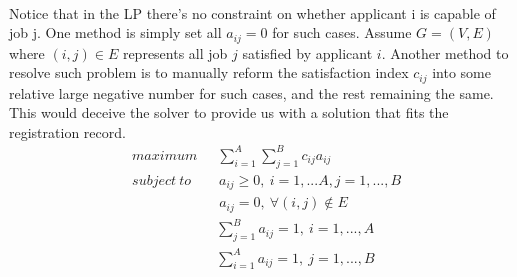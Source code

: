 \paragraph{}
Notice that in the LP there's no constraint on whether applicant i is capable of job j. One method is simply set all $a_{ij} = 0$ for such cases. Assume $G=(V,E)$ where $(i, j)\in E$ represents all job $j$ satisfied by applicant $i$. Another method to resolve such problem is to manually reform the satisfaction index $c_{ij}$ into some relative large negative number for such cases, and the rest remaining the same. This would deceive the solver to provide us with a solution that fits the registration record. 
\begin{align*}
& maximum \quad \ \ \sum_{i=1}^{A}\sum_{j=1}^{B}c_{ij}a_{ij} \\
& subject \ to \qquad a_{ij}\geq 0, \ i=1,...A, j=1,...,B\\
&\qquad \qquad \quad \quad  \ a_{ij} = 0, \ \forall (i,j) \notin E\\
&\qquad \qquad \quad \quad \sum_{j=1}^{B}a_{ij}=1,\ i=1,...,A\\
&\qquad \qquad \quad \quad \sum_{i=1}^{A}a_{ij}=1,\ j=1,...,B\\
\end{align*}